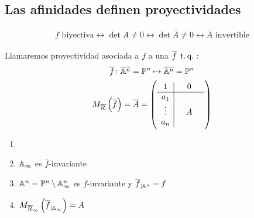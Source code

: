     \subsection{Las afinidades definen proyectividades}
    \begin{gather*}
    f\text{ biyectiva} \leftrightarrow \det A \ne 0 \leftrightarrow \det \overline{A} \ne 0 \leftrightarrow \overline{A} \text{ invertible}
    \end{gather*}
    \begin{defi}
        Llamaremos proyectividad asociada a $f$ a una $\overline{f} \operatorname{\;t.q.\;}$:
        \begin{gather*}
            \overline{f} \colon \overline{\mathbb{A}^n} = \mathbb{P}^n \mapsto \overline{\mathbb{A}^n} = \mathbb{P}^n \\
            M_{\overline{\mathcal{R}}}\left( \overline{f}\right) = \overline{A} = 
            \left(
            \begin{array}{c|ccc}
                1 &  & 0 & \\ \hline
                a_1 & & & \\
                \vdots & & A & \\
                a_n & & & 
            \end{array} \right) \\ 
        \end{gather*}
    \end{defi}
    \begin{prop}
        \begin{enumerate}
            \item[]
            \item $\mathbb{A}_\infty$ es $\overline{f}$-invariante
            \item $\mathbb{A}^n = \mathbb{P}^n \setminus \mathbb{A}_\infty^n$ es $\overline{f}$-invariante y $\overline{f}_{|\mathbb{A}^n}=f$
            \item $M_{\overline{\mathcal{R}}_\infty}\left( \overline{f}_{|\mathbb{A}_\infty} \right) = A$
        \end{enumerate}
    \end{prop}

